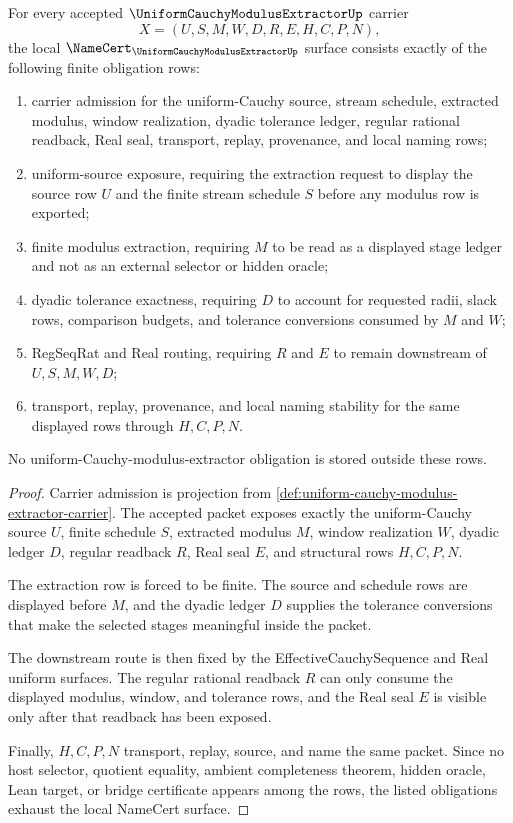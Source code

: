 \begin{theorem}
\label{thm:uniform-cauchy-modulus-extractor-namecert-obligations}
For every accepted $\UniformCauchyModulusExtractorUp$ carrier
$$
X=(U,S,M,W,D,R,E,H,C,P,N),
$$
the local $\NameCert_{\UniformCauchyModulusExtractorUp}$ surface consists exactly of the following finite obligation rows:
\begin{enumerate}
\item carrier admission for the uniform-Cauchy source, stream schedule, extracted modulus, window realization, dyadic tolerance ledger, regular rational readback, Real seal, transport, replay, provenance, and local naming rows;
\item uniform-source exposure, requiring the extraction request to display the source row $U$ and the finite stream schedule $S$ before any modulus row is exported;
\item finite modulus extraction, requiring $M$ to be read as a displayed stage ledger and not as an external selector or hidden oracle;
\item dyadic tolerance exactness, requiring $D$ to account for requested radii, slack rows, comparison budgets, and tolerance conversions consumed by $M$ and $W$;
\item RegSeqRat and Real routing, requiring $R$ and $E$ to remain downstream of $U,S,M,W,D$;
\item transport, replay, provenance, and local naming stability for the same displayed rows through $H,C,P,N$.
\end{enumerate}
No uniform-Cauchy-modulus-extractor obligation is stored outside these rows.
\end{theorem}
\begin{proof}
Carrier admission is projection from \autoref{def:uniform-cauchy-modulus-extractor-carrier}. The accepted packet exposes exactly the uniform-Cauchy source $U$, finite schedule $S$, extracted modulus $M$, window realization $W$, dyadic ledger $D$, regular readback $R$, Real seal $E$, and structural rows $H,C,P,N$.

The extraction row is forced to be finite. The source and schedule rows are displayed before $M$, and the dyadic ledger $D$ supplies the tolerance conversions that make the selected stages meaningful inside the packet.

The downstream route is then fixed by the EffectiveCauchySequence and Real uniform surfaces. The regular rational readback $R$ can only consume the displayed modulus, window, and tolerance rows, and the Real seal $E$ is visible only after that readback has been exposed.

Finally, $H,C,P,N$ transport, replay, source, and name the same packet. Since no host selector, quotient equality, ambient completeness theorem, hidden oracle, Lean target, or bridge certificate appears among the rows, the listed obligations exhaust the local NameCert surface.
\end{proof}

